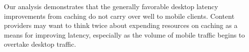 Our analysis demonstrates that the generally favorable desktop latency improvements from caching do not carry over well to mobile clients.
Content providers may want to think twice about expending resources on caching as a means for improving latency, especially as the volume of mobile traffic begins to overtake desktop traffic.

